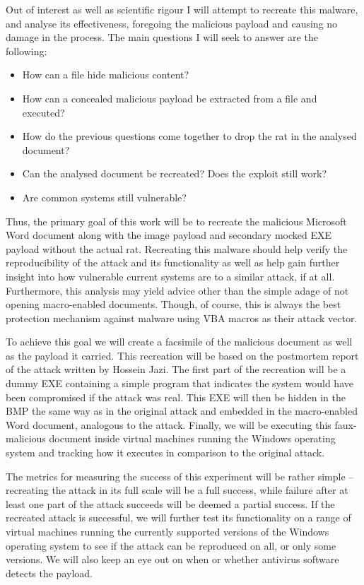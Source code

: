 Out of interest as well as scientific rigour I will attempt to recreate this malware, and analyse its effectiveness,
foregoing the malicious payload and causing no damage in the process. The main questions I will seek to answer are the following:
\begin{itemize}
  \item How can a file hide malicious content?
  \item How can a concealed malicious payload be extracted from a file and executed?
  \item How do the previous questions come together to drop the \acrfull{rat} in the analysed document?
  \item Can the analysed document be recreated? Does the exploit still work?
  \item Are common systems still vulnerable?
\end{itemize}

Thus, the primary goal of this work will be to recreate the malicious Microsoft Word document along with the image
payload and secondary mocked \acrfull{EXE} payload without the actual \acrlong{rat}. Recreating this malware should help
verify the reproducibility of the attack and its functionality as well as help gain further
insight into how vulnerable current systems are to a similar attack, if at all. Furthermore, this analysis may yield
advice other than the simple adage of not opening macro-enabled documents. Though, of course, this is always the best
protection mechanism against malware using \acrshort{VBA} macros as their attack vector.

To achieve this goal we will create a facsimile of the malicious document as well as the payload it carried.
This recreation will be based on the postmortem report of the attack written by Hossein Jazi. 
The first part of the recreation will be a dummy \acrlong{EXE} containing a simple program that indicates the 
system would have been compromised if the attack was real. This \acrshort{EXE} will then be hidden in the \acrshort{BMP}
the same way as in the original attack and embedded in the macro-enabled Word document, analogous to the attack.
Finally, we will be executing this faux-malicious document inside virtual machines running the Windows operating system
and tracking how it executes in comparison to the original attack. 

The metrics for measuring the success of this experiment will be rather simple -- recreating the attack in its full
scale will be a full success, while failure after at least one part of the attack succeeds will be deemed a partial
success. If the recreated attack is successful, we will further test its functionality on a range of virtual machines
running the currently supported versions of the Windows operating system to see if the attack can be reproduced on all,
or only some versions. We will also keep an eye out on when or whether antivirus software detects the payload.

